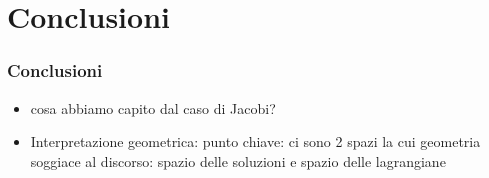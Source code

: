 \documentclass{beamer}
\begin{document}
\section*{Conclusioni}

	\begin{frame}
		\frametitle{ Conclusioni }
			\begin{itemize}
				\item cosa abbiamo capito dal caso di Jacobi?
				\item Interpretazione geometrica: punto chiave: ci sono 2 spazi la cui geometria soggiace al discorso: spazio delle soluzioni e spazio delle lagrangiane
			\end{itemize}
	\end{frame}
	
\end{document}
